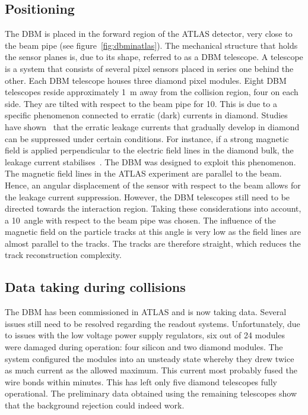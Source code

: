 \documentclass[12pt]{packages/mytustyle}  %
\begin{document}
\subsection{Positioning}
The DBM is placed in the forward region of the ATLAS detector, very close to the beam pipe (see figure~\ref{fig:dbminatlas}). The mechanical structure that holds the sensor planes is, due to its shape, referred to as a DBM telescope. A telescope is a system that consists of several pixel sensors placed in series one behind the other. Each DBM telescope houses three diamond pixel modules. Eight DBM telescopes reside approximately 1~m away from the collision region, four on each side. They are tilted with respect to the beam pipe for 10\textdegree. This is due to a specific phenomenon connected to erratic (dark) currents in diamond. Studies have shown~\cite{} that the erratic leakage currents that gradually develop in diamond can be suppressed under certain conditions. For instance, if a strong magnetic field is applied perpendicular to the electric field lines in the diamond bulk, the leakage current stabilises~\cite{}. The DBM was designed to exploit this phenomenon. The magnetic field lines in the ATLAS experiment are parallel to the beam. Hence, an angular displacement of the sensor with respect to the beam allows for the leakage current suppression. However, the DBM telescopes still need to be directed towards the interaction region. Taking these considerations into account, a 10\textdegree~angle with respect to the beam pipe was chosen. The influence of the magnetic field on the particle tracks at this angle is very low as the field lines are almost parallel to the tracks. The tracks are therefore straight, which reduces the track reconstruction complexity.




\subsection{Data taking during collisions}
The DBM has been commissioned in ATLAS and is now taking data. Several issues still need to be resolved regarding the readout systems. Unfortunately, due to issues with the low voltage power supply regulators, six out of 24 modules were damaged during operation: four silicon and two diamond modules. The system configured the modules into an unsteady state whereby they drew twice as much current as the allowed maximum. This current most probably fused the wire bonds within minutes. This has left only five diamond telescopes fully operational. The preliminary data obtained using the remaining telescopes show that the background rejection could indeed work. 
\end{document}
